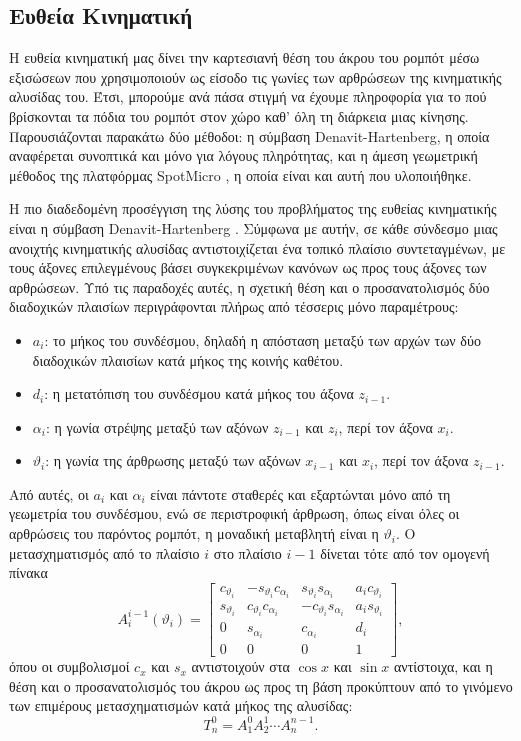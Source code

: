 \documentclass[11pt]{report}
\begin{document}
\subsection{Ευθεία Κινηματική}
Η ευθεία κινηματική μας δίνει την καρτεσιανή θέση του άκρου του ρομπότ μέσω
εξισώσεων που χρησιμοποιούν ως είσοδο τις γωνίες των αρθρώσεων της κινηματικής
αλυσίδας του. Έτσι, μπορούμε ανά πάσα στιγμή να έχουμε πληροφορία για το πού
βρίσκονται τα πόδια του ρομπότ στον χώρο καθ' όλη τη διάρκεια μιας κίνησης.
Παρουσιάζονται παρακάτω δύο μέθοδοι: η σύμβαση Denavit-Hartenberg, η οποία
αναφέρεται συνοπτικά και μόνο για λόγους πληρότητας, και η άμεση γεωμετρική
μέθοδος της πλατφόρμας SpotMicro \cite{spotmicroai_project}, η οποία είναι και
αυτή που υλοποιήθηκε.


Η πιο διαδεδομένη προσέγγιση της λύσης του προβλήματος της ευθείας κινηματικής
είναι η σύμβαση Denavit-Hartenberg \cite{siciliano_robotics_2009}. Σύμφωνα με
αυτήν, σε κάθε σύνδεσμο μιας ανοιχτής κινηματικής αλυσίδας αντιστοιχίζεται ένα
τοπικό πλαίσιο συντεταγμένων, με τους άξονες επιλεγμένους βάσει συγκεκριμένων
κανόνων ως προς τους άξονες των αρθρώσεων. Υπό τις παραδοχές αυτές, η σχετική
θέση και ο προσανατολισμός δύο διαδοχικών πλαισίων περιγράφονται πλήρως από
τέσσερις μόνο παραμέτρους:
\begin{itemize}
  \item $a_i$: το μήκος του συνδέσμου, δηλαδή η απόσταση μεταξύ των αρχών των
  δύο διαδοχικών πλαισίων κατά μήκος της κοινής καθέτου.
  \item $d_i$: η μετατόπιση του συνδέσμου κατά μήκος του άξονα $z_{i-1}$.
  \item $\alpha_i$: η γωνία στρέψης μεταξύ των αξόνων $z_{i-1}$ και $z_i$, περί
  τον άξονα $x_i$.
  \item $\vartheta_i$: η γωνία της άρθρωσης μεταξύ των αξόνων $x_{i-1}$ και
  $x_i$, περί τον άξονα $z_{i-1}$.
\end{itemize}
Από αυτές, οι $a_i$ και $\alpha_i$ είναι πάντοτε σταθερές και εξαρτώνται μόνο
από τη γεωμετρία του συνδέσμου, ενώ σε περιστροφική άρθρωση, όπως είναι όλες οι
αρθρώσεις του παρόντος ρομπότ, η μοναδική μεταβλητή είναι η $\vartheta_i$. Ο
μετασχηματισμός από το πλαίσιο $i$ στο πλαίσιο $i-1$ δίνεται τότε από τον
ομογενή πίνακα
\begin{equation}
A_i^{i-1}(\vartheta_i) =
\begin{bmatrix}
c_{\vartheta_i} & -s_{\vartheta_i} c_{\alpha_i} & s_{\vartheta_i} s_{\alpha_i} & a_i c_{\vartheta_i} \\
s_{\vartheta_i} & c_{\vartheta_i} c_{\alpha_i} & -c_{\vartheta_i} s_{\alpha_i} & a_i s_{\vartheta_i} \\
0 & s_{\alpha_i} & c_{\alpha_i} & d_i \\
0 & 0 & 0 & 1
\end{bmatrix},
\label{eq:dh-matrix}
\end{equation}
όπου οι συμβολισμοί $c_x$ και $s_x$ αντιστοιχούν στα $\cos x$ και $\sin x$
αντίστοιχα, και η
θέση και ο προσανατολισμός του άκρου ως προς τη βάση προκύπτουν από το γινόμενο
των επιμέρους μετασχηματισμών κατά μήκος της αλυσίδας:
\begin{equation}
T_n^0 = A_1^0 A_2^1 \cdots A_n^{n-1}.
\label{eq:dh-chain}
\end{equation}
\end{document}
